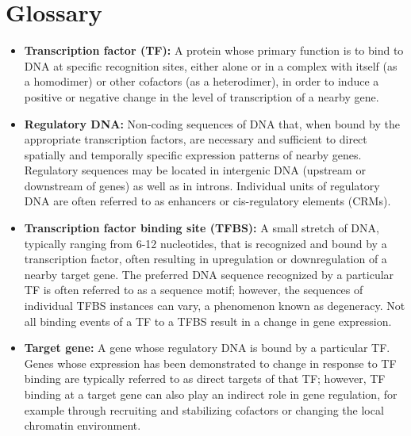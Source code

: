 \section{Glossary}
\begin{itemize}
	\item \textbf{Transcription factor (TF):} A protein whose primary function is to bind to DNA at specific recognition sites, either alone or in a complex with itself (as a homodimer) or other cofactors (as a heterodimer), in order to induce a positive or negative change in the level of transcription of a nearby gene.
	\item \textbf{Regulatory DNA:} Non-coding sequences of DNA that, when bound by the appropriate transcription factors, are necessary and sufficient to direct spatially and temporally specific expression patterns of nearby genes. Regulatory sequences may be located in intergenic DNA (upstream or downstream of genes) as well as in introns. Individual units of regulatory DNA are often referred to as enhancers or cis-regulatory elements (CRMs).
	\item \textbf{Transcription factor binding site (TFBS):} A small stretch of DNA, typically ranging from 6-12 nucleotides, that is recognized and bound by a transcription factor, often resulting in upregulation or downregulation of a nearby target gene. The preferred DNA sequence recognized by a particular TF is often referred to as a sequence motif; however, the sequences of individual TFBS instances can vary, a phenomenon known as degeneracy. Not all binding events of a TF to a TFBS result in a change in gene expression.
	\item \textbf{Target gene:} A gene whose regulatory DNA is bound by a particular TF. Genes whose expression has been demonstrated to change in response to TF binding are typically referred to as direct targets of that TF; however, TF binding at a target gene can also play an indirect role in gene regulation, for example through recruiting and stabilizing cofactors or changing the local chromatin environment.
\end{itemize}

